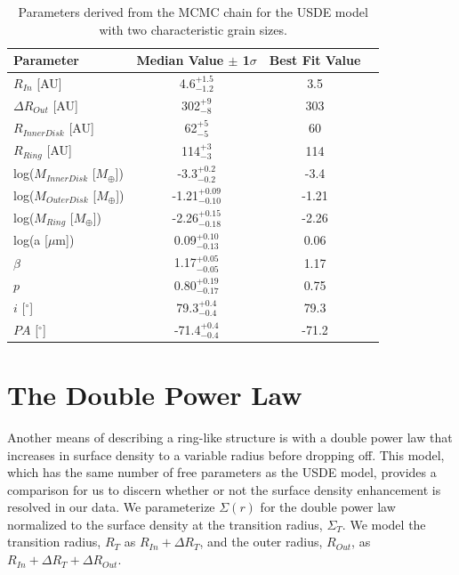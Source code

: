 \begin{table}
\begin{center}
    \def\arraystretch{1.2}%
    \begin{tabular}{l*{2}{c}r}
    \hline
    Parameter & Median Value $\pm$ 1$\sigma$ & Best Fit Value \\ \hline
     $R_{In}$  [AU] & 4.6$^{+1.5}_{-1.2}$ & 3.5\\  
     $\Delta R_{Out}$ [AU] & 302$^{+9}_{-8}$ & 303\\ 
     $R_{Inner Disk}$ [AU] & 62$^{+5}_{-5}$ & 60\\ 
     $R_{Ring}$  [AU] & 114$^{+3}_{-3}$ & 114\\ 
     log($M_{Inner Disk}$ [$M_{\oplus}$]) & -3.3$^{+0.2}_{-0.2}$ & -3.4 \\
     log($M_{Outer Disk}$ [$M_{\oplus}$]) & -1.21$^{+0.09}_{-0.10}$ &-1.21 \\
     log($M_{Ring}$ [$M_{\oplus}$]) & -2.26$^{+0.15}_{-0.18}$ &-2.26 \\
     log(a [$\mu$m]) & 0.09$^{+0.10}_{-0.13}$ & 0.06\\ 
     $\beta$ & 1.17$^{+0.05}_{-0.05}$ & 1.17\\ 
     $p$ & 0.80$^{+0.19}_{-0.17}$ & 0.75\\ 
     $i$ [$^\circ$] & 79.3$^{+0.4}_{-0.4}$ & 79.3 \\ 
     $PA$ [$^\circ$] & -71.4$^{+0.4}_{-0.4}$ & -71.2\\
    \hline
    \end{tabular}
\end{center}
\caption{Parameters derived from the MCMC chain for the USDE model with two characteristic grain sizes.}
\label{tab:bBBAG_Table}
\end{table}



\section{The Double Power Law}
\label{DP}

Another means of describing a ring-like structure is with a double power law that increases in surface density to a variable radius before dropping off. This model, which has the same number of free parameters as the USDE model, provides a comparison for us to discern whether or not the surface density enhancement is resolved in our data. We parameterize $\Sigma(r)$ for the double power law normalized to the surface density at the transition radius, $\Sigma_{T}$. We model the transition radius, $R_{T}$ as $R_{In} + \Delta R_{T}$, and the outer radius, $R_{Out}$, as $R_{In} + \Delta R_{T} + \Delta R_{Out}$.

